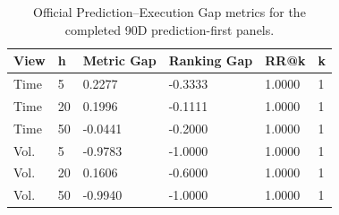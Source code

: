 \begin{table}[t]
\centering
\caption{Official Prediction–Execution Gap metrics for the completed 90D prediction-first panels.}
\label{tab:table_03_gap_metrics}
\begin{tabular}{llllll}
\toprule
View & h & Metric Gap & Ranking Gap & RR@k & k \\
\midrule
Time & 5 & 0.2277 & -0.3333 & 1.0000 & 1 \\
Time & 20 & 0.1996 & -0.1111 & 1.0000 & 1 \\
Time & 50 & -0.0441 & -0.2000 & 1.0000 & 1 \\
Vol. & 5 & -0.9783 & -1.0000 & 1.0000 & 1 \\
Vol. & 20 & 0.1606 & -0.6000 & 1.0000 & 1 \\
Vol. & 50 & -0.9940 & -1.0000 & 1.0000 & 1 \\
\bottomrule
\end{tabular}
\end{table}
